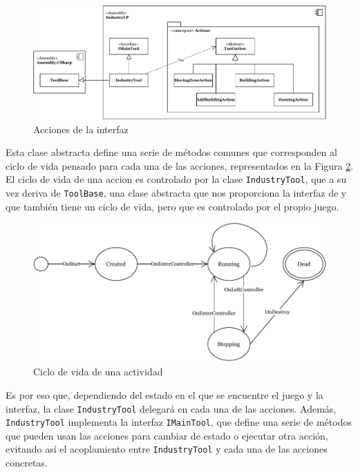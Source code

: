 \begin{figure}[!h]
	\centering
	\includegraphics[width=\textwidth]{images/actions}
	\caption{Acciones de la interfaz}
	\label{fig:actions}
\end{figure}

Esta clase abstracta define una serie de métodos comunes que corresponden al ciclo de vida pensado para cada una de las acciones, representados en la Figura \ref{fig:action-lifecycle}. El ciclo de vida de una accion es controlado por la clase \texttt{IndustryTool}, que a su vez deriva de \texttt{ToolBase}, una clase abstracta que nos proporciona la interfaz de \cities y que también tiene un ciclo de vida, pero que es controlado por el propio juego.

\begin{figure}[!h]
	\centering
	\includegraphics[width=\textwidth]{images/action-lifecycle}
	\caption{Ciclo de vida de una actividad}
	\label{fig:action-lifecycle}
\end{figure}

Es por eso que, dependiendo del estado en el que se encuentre el juego y la interfaz, la clase \texttt{IndustryTool} delegará en cada una de las acciones. Además, \texttt{IndustryTool} implementa la interfaz \texttt{IMainTool}, que define una serie de métodos que pueden usan las acciones para cambiar de estado o ejecutar otra acción, evitando así el acoplamiento entre \texttt{IndustryTool} y cada una de las acciones concretas. \\

